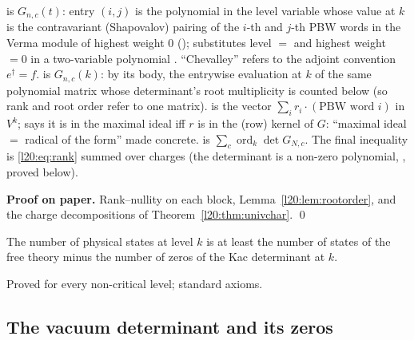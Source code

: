 \begin{dictionary}
 is $G_{n,c}(t)$: entry $(i,j)$ is the polynomial in the level variable 
whose value at $k$ is the contravariant (Shapovalov) pairing  of the $i$-th and $j$-th PBW
words in the Verma module of highest weight $0$ ();  substitutes
level $=$  and highest weight $=0$ in a two-variable polynomial . ``Chevalley'' refers
to the adjoint convention $e^\dagger=f$.  is $G_{n,c}(k)$: by its body, the entrywise evaluation at $k$ of the
same polynomial matrix whose determinant's root multiplicity is counted below (so rank and root order refer to one
matrix).  is the vector $\sum_ir_i\cdot(\text{PBW word }i)$ in $V^k$;
 says it is in the maximal ideal iff $r$ is in the (row) kernel of $G$:
``maximal ideal $=$ radical of the form'' made concrete.  is
$\sum_c\operatorname{ord}_k\det G_{N,c}$. The final inequality is \eqref{l20:eq:rank} summed over charges (the
determinant is a non-zero polynomial, , proved below).
\end{dictionary}

\textbf{Proof on paper.} Rank--nullity on each block, Lemma~\ref{l20:lem:rootorder}, and the charge decompositions of
Theorem~\ref{l20:thm:univchar}. \qed

\begin{physics}
The number of physical states at level $k$ is at least the number of states of the free theory minus the number
of zeros of the Kac determinant at $k$.
\end{physics}

\begin{status}
Proved for every non-critical level; standard axioms.
\end{status}

\subsection{The vacuum determinant and its zeros}

